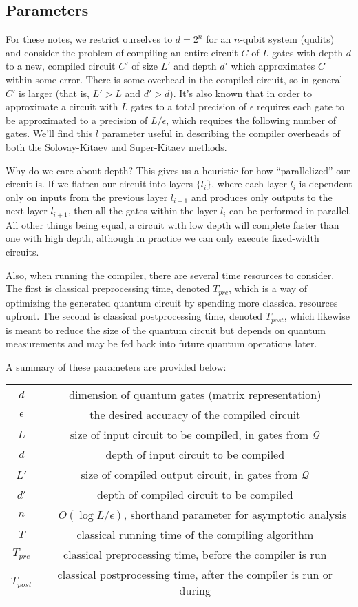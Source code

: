 \subsection{Parameters}

For these notes, we restrict ourselves to $d=2^n$ for an $n$-qubit system (qudits)
and consider the problem of compiling an entire circuit $C$ of $L$ gates with depth
$d$ to a new, compiled circuit $C'$ of size $L'$ and depth $d'$ which approximates
$C$ within some error. There is some overhead in the compiled circuit, so in
general $C'$ is larger (that is, $L' > L$ and $d' > d$). It's also known that
in order to approximate a circuit with $L$ gates to a total precision of $\epsilon$
requires each gate to be approximated to a precision of $L/\epsilon$, which requires
the following number of gates. We'll find this $l$ parameter useful in describing the compiler overheads of
both the Solovay-Kitaev and Super-Kitaev methods.

Why do we care about depth? This gives us a heuristic for how ``parallelized'' our
circuit is. If we flatten our circuit into layers $\{l_i\}$, where each layer $l_i$
is dependent only on inputs from the previous layer $l_{i-1}$ and produces
only outputs to the next layer $l_{i+1}$, then all the gates within the layer
$l_i$ can be performed in parallel. All other things being equal, a circuit with low depth will complete
faster than one with high depth, although in practice we can only execute
fixed-width circuits.

Also, when running the compiler, there are several time resources to consider.
The first is classical preprocessing time, denoted $T_{pre}$, which is a way of optimizing
the generated quantum circuit by spending more classical resources upfront.
The second is classical postprocessing time, denoted $T_{post}$, which likewise
is meant to reduce the size of the quantum circuit but depends on quantum
measurements and may be fed back into future quantum operations later.

A summary of these parameters are provided below:

\begin{tabular}{|c|c|}
\hline
$d$ & dimension of quantum gates (matrix representation)\\
$\epsilon$ & the desired accuracy of the compiled circuit\\
$L$ & size of input circuit to be compiled, in gates from $\mathcal{Q}$\\
$d$ & depth of input circuit to be compiled\\
$L'$ & size of compiled output circuit, in gates from $\mathcal{Q}$\\
$d'$ & depth of compiled circuit to be compiled\\
$n$ & $=O(\log{L/\epsilon})$, shorthand parameter for asymptotic analysis\\
$T$ & classical running time of the compiling algorithm\\
$T_{pre}$ & classical preprocessing time, before the compiler is run\\
$T_{post}$ & classical postprocessing time, after the compiler is run or during\\
\hline
\end{tabular}

